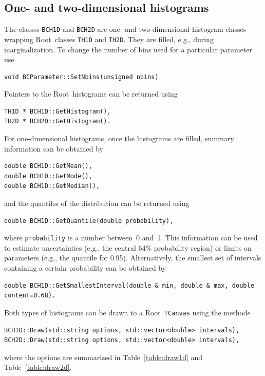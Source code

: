 \documentclass[11pt, a4paper]{article}
\newcommand{\Root}{{\sc Root}}
\begin{document}

\subsection{One- and two-dimensional histograms}
\label{sec:one-two-dim-hist}

The classes \verb|BCH1D| and \verb|BCH2D| are one- and two-dimensional
histogram classes wrapping \Root\ classes \verb|TH1D| and
\verb|TH2D|. They are filled, e.g., during marginalization. To change
the number of bins used for a particular parameter use
%
\begin{verbatim}
void BCParameter::SetNbins(unsigned nbins)
\end{verbatim}
%
Pointers to the \Root\ histograms can be returned
using
%
\begin{verbatim}
TH1D * BCH1D::GetHistogram(),
TH2D * BCH2D::GetHistogram().
\end{verbatim}
%
For one-dimensional histograms, once the histograms are filled,
summary information can be obtained by
%
\begin{verbatim}
double BCH1D::GetMean(),
double BCH1D::GetMode(),
double BCH1D::GetMedian(),
\end{verbatim}
%
and the quantiles of the distribution can be returned using
%
\begin{verbatim}
double BCH1D::GetQuantile(double probability),
\end{verbatim}
%
where \verb|probability| is a number between~0 and~1. This information
can be used to estimate uncertainties (e.g., the central 64\%
probability region) or limits on parameters (e.g., the quantile for
0.95). Alternatively, the smallest set of intervals containing a
certain probability can be obtained by
%
\begin{verbatim}
double BCH1D::GetSmallestInterval(double & min, double & max, double content=0.68).
\end{verbatim}

Both types of histograms can be drawn to a \Root\ \verb|TCanvas| using
the methods
%
\begin{verbatim}
BCH1D::Draw(std::string options, std::vector<double> intervals),
BCH2D::Draw(std::string options, std::vector<double> intervals),
\end{verbatim}
%
where the options are summarized in Table~\ref{table:draw1d} and
Table~\ref{table:draw2d}.
\end{document}
